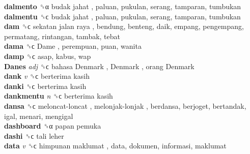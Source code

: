 \textbf{dalmento} ␝α   budak jahat , paluan, pukulan, serang, tamparan, tumbukan  \\
\textbf{dalmentu} ␝ϲ   budak jahat , paluan, pukulan, serang, tamparan, tumbukan  \\
\textbf{dam} ␝ϲ   sekatan jalan raya , bendung, benteng, daik, empang, pengempang, permatang, rintangan, tambak, tebat  \\
\textbf{dama} ␝ϲ   Dame , perempuan, puan, wanita  \\
\textbf{damp} ␝ϲ  asap, kabus, wap  \\
\textbf{Danes} \emph{adj}  ␝ϲ   bahasa Denmark ,  Denmark ,  orang Denmark   \\
\textbf{dank} \emph{v}  ␝ϲ   berterima kasih   \\
\textbf{danki} ␝ϲ   berterima kasih   \\
\textbf{dankmentu} \emph{n}  ␝ϲ   berterima kasih   \\
\textbf{dansa} ␝ϲ   meloncat-loncat ,  melonjak-lonjak , berdansa, berjoget, bertandak, igal, menari, mengigal  \\
\textbf{dashboard} ␝α   papan pemuka   \\
\textbf{dashi} ␝ϲ   tali leher   \\
\textbf{data} \emph{v}  ␝ϲ   himpunan maklumat , data, dokumen, informasi, maklumat  \\
